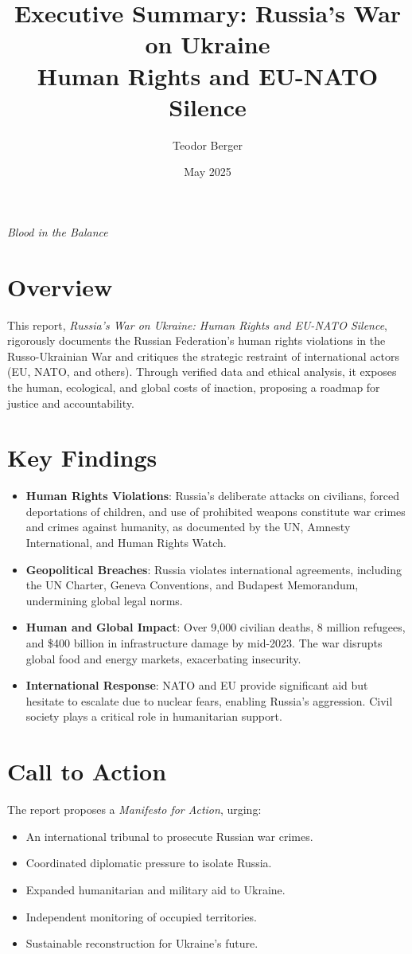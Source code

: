 \documentclass[a4paper,12pt]{article}
\title{Executive Summary: Russia’s War on Ukraine \\ Human Rights and EU-NATO Silence}
\author{Teodor Berger}
\date{May 2025}
\begin{document}
\maketitle

\vspace{-1em}
\begin{center}
    \small \textit{Blood in the Balance}
\end{center}

\section*{Overview}
This report, \textit{Russia’s War on Ukraine: Human Rights and EU-NATO Silence}, rigorously documents the Russian Federation’s human rights violations in the Russo-Ukrainian War and critiques the strategic restraint of international actors (EU, NATO, and others). Through verified data and ethical analysis, it exposes the human, ecological, and global costs of inaction, proposing a roadmap for justice and accountability.

\section*{Key Findings}
\begin{itemize}
    \item \textbf{Human Rights Violations}: Russia’s deliberate attacks on civilians, forced deportations of children, and use of prohibited weapons constitute war crimes and crimes against humanity, as documented by the UN, Amnesty International, and Human Rights Watch.
    \item \textbf{Geopolitical Breaches}: Russia violates international agreements, including the UN Charter, Geneva Conventions, and Budapest Memorandum, undermining global legal norms.
    \item \textbf{Human and Global Impact}: Over 9,000 civilian deaths, 8 million refugees, and \$400 billion in infrastructure damage by mid-2023. The war disrupts global food and energy markets, exacerbating insecurity.
    \item \textbf{International Response}: NATO and EU provide significant aid but hesitate to escalate due to nuclear fears, enabling Russia’s aggression. Civil society plays a critical role in humanitarian support.
\end{itemize}

\section*{Call to Action}
The report proposes a \textit{Manifesto for Action}, urging:
\begin{itemize}
    \item An international tribunal to prosecute Russian war crimes.
    \item Coordinated diplomatic pressure to isolate Russia.
    \item Expanded humanitarian and military aid to Ukraine.
    \item Independent monitoring of occupied territories.
    \item Sustainable reconstruction for Ukraine’s future.
\end{itemize}
\end{document}
